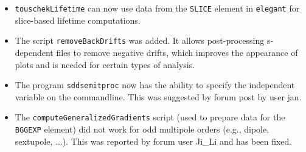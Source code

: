 \documentclass[11pt]{article}
\begin{document}
\begin{itemize}
\item \verb|touschekLifetime| can now use data from the \verb|SLICE| element in {\tt elegant} for slice-based lifetime computations.
\item The script \verb|removeBackDrifts| was added. It allows post-processing s-dependent files to remove negative drifts, which
  improves the appearance of plots and is needed for certain types of analysis.
\item The program \verb|sddsemitproc| now has the ability to specify the independent variable on the commandline. This was
  suggested by forum post by user jan.
\item The \verb|computeGeneralizedGradients| script (used to prepare data for the \verb|BGGEXP| element) did not work
  for odd multipole orders (e.g., dipole, sextupole, ...). This was reported by forum user Ji\_Li and has been fixed.
\end{itemize}
\end{document}
